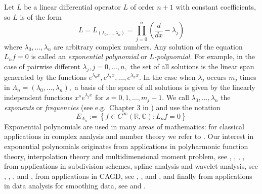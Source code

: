 \documentclass[11pt]{article}%
\begin{document}
Let $L$ be a linear differential operator $L$ of order $n+1$ with constant
coefficients, so $L$ is of the form
\begin{equation}
L=L_{\left(  \lambda_{0},...,\lambda_{n}\right)  }=\prod_{j=0}^{n}\left(
\frac{d}{dx}-\lambda_{j}\right)  \label{neuLa}%
\end{equation}
where $\lambda_{0},...,\lambda_{n}$ are arbitrary complex numbers. Any
solution of the equation $L_{n}f=0$ is called an \emph{exponential polynomial}
or $L$\emph{-polynomial. }For example, in the case of pairwise different
$\lambda_{j},j=0,\ldots,n,$ the set of all solutions is the linear span
generated by the functions $e^{\lambda_{0}x},e^{\lambda_{1}x},\ldots
,e^{\lambda_{n}x}.$ In the case when $\lambda_{j}$ occurs $m_{j}$ times in
$\Lambda_{n}=\left(  \lambda_{0},\ldots,\lambda_{n}\right)  ,$ a basis of the
space of all solutions is given by the linearly independent functions
$x^{s}e^{\lambda_{j}x}$ for $s=0,1,\ldots,m_{j}-1.$ We call $\lambda
_{0},\ldots,\lambda_{n}$ the \emph{exponents} or \emph{frequencies} (see
e.g.\ Chapter 3 in \cite{BeGa95}) and use the notation
\begin{equation}
E_{\Lambda_{n}}:=\left\{  f\in C^{\infty}\left(  \mathbb{R},\mathbb{C}\right)
:L_{n}f=0\right\}  \label{solutspace}%
\end{equation}
Exponential polynomials are used in many areas of mathematics: for classical
applications in complex analysis and number theory we refer to \cite{BeGa95}.
Our interest in exponential polynomials originates from applications in
polyharmonic function theory,  interpolation theory and multidimensional
moment problem, see \cite{KoRe13}, \cite{KoReMathNach},  \cite{KoReInter2019},
\cite{KoReArkiv2010}, from applications in subdivision schemes, spline
analysis and wavelet analysis, see \cite{dynlevinexp}, \cite{DKLR11}
\cite{KounchevRender2021JCAM}, \cite{McCa91}, \cite{micchelli} and
\cite{Unser}, from applications in CAGD, see \cite{AKR07}, \cite{CMP04},
\cite{CMP14} and \cite{CMP17}, and finally from applications in data analysis
for smoothing data, see \cite{KounchevRenderTsachevBIT} and
\cite{RamsaySilverman}.
\end{document}
